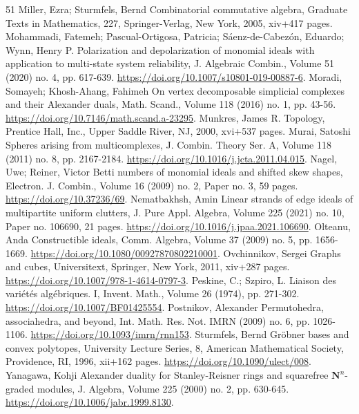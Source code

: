 \begin{thebibliography}{51}
 Miller, Ezra; Sturmfels, Bernd Combinatorial commutative algebra, Graduate Texts in Mathematics, 227, Springer-Verlag, New York, 2005, xiv+417 pages.
 Mohammadi, Fatemeh; Pascual-Ortigosa, Patricia; Sáenz-de-Cabezón, Eduardo; Wynn, Henry P. Polarization and depolarization of monomial ideals with application to multi-state system reliability, J. Algebraic Combin., Volume 51 (2020) no. 4, pp. 617-639. \url{https://doi.org/10.1007/s10801-019-00887-6}.
 Moradi, Somayeh; Khosh-Ahang, Fahimeh On vertex decomposable simplicial complexes and their Alexander duals, Math. Scand., Volume 118 (2016) no. 1, pp. 43-56. \url{https://doi.org/10.7146/math.scand.a-23295}.
 Munkres, James R. Topology, Prentice Hall, Inc., Upper Saddle River, NJ, 2000, xvi+537 pages.
 Murai, Satoshi Spheres arising from multicomplexes, J. Combin. Theory Ser. A, Volume 118 (2011) no. 8, pp. 2167-2184. \url{https://doi.org/10.1016/j.jcta.2011.04.015}.
 Nagel, Uwe; Reiner, Victor Betti numbers of monomial ideals and shifted skew shapes, Electron. J. Combin., Volume 16 (2009) no. 2, Paper no. 3, 59 pages. \url{https://doi.org/10.37236/69}.
 Nematbakhsh, Amin Linear strands of edge ideals of multipartite uniform clutters, J. Pure Appl. Algebra, Volume 225 (2021) no. 10, Paper no. 106690, 21 pages. \url{https://doi.org/10.1016/j.jpaa.2021.106690}.
 Olteanu, Anda Constructible ideals, Comm. Algebra, Volume 37 (2009) no. 5, pp. 1656-1669. \url{https://doi.org/10.1080/00927870802210001}.
 Ovchinnikov, Sergei Graphs and cubes, Universitext, Springer, New York, 2011, xiv+287 pages. \url{https://doi.org/10.1007/978-1-4614-0797-3}.
 Peskine, C.; Szpiro, L. Liaison des variétés algébriques. I, Invent. Math., Volume 26 (1974), pp. 271-302. \url{https://doi.org/10.1007/BF01425554}.
 Postnikov, Alexander Permutohedra, associahedra, and beyond, Int. Math. Res. Not. IMRN (2009) no. 6, pp. 1026-1106. \url{https://doi.org/10.1093/imrn/rnn153}.
 Sturmfels, Bernd Gröbner bases and convex polytopes, University Lecture Series, 8, American Mathematical Society, Providence, RI, 1996, xii+162 pages. \url{https://doi.org/10.1090/ulect/008}.
 Yanagawa, Kohji Alexander duality for Stanley-Reisner rings and squarefree $\mathbf{N}^n$-graded modules, J. Algebra, Volume 225 (2000) no. 2, pp. 630-645. \url{https://doi.org/10.1006/jabr.1999.8130}.
\end{thebibliography}
